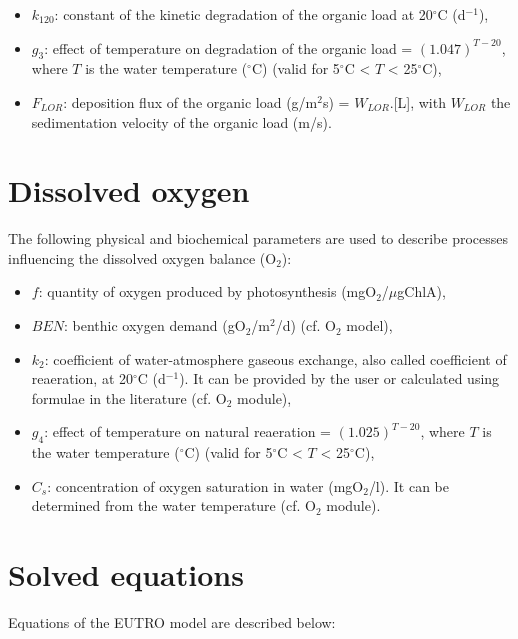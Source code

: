 \begin{itemize}
\item $k_{120}$: constant of the kinetic degradation of the organic load at 20$^{\circ}$C (d$^{-1}$),
\item $g_3$: effect of temperature on degradation of the organic load = $(1.047)^{T-20}$,
  where $T$ is the water temperature ($^{\circ}$C) (valid for 5$^{\circ}$C < $T$ < 25$^{\circ}$C),
\item $F_{LOR}$: deposition flux of the organic load (g/m$^2$s) = $W_{LOR}$.[L],
  with $W_{LOR}$ the sedimentation velocity of the organic load (m/s).
\end{itemize}

\section{Dissolved oxygen}

The following physical and biochemical parameters are used to describe processes
influencing the dissolved oxygen balance (O$_2$):

\begin{itemize}
\item $f$: quantity of oxygen produced by photosynthesis (mgO$_2$/$\mu$gChlA),
\item $BEN$: benthic oxygen demand (gO$_2$/m$^2$/d) (cf. O$_2$ model),
\item $k_2$: coefficient of water-atmosphere gaseous exchange,
  also called coefficient of reaeration, at 20$^{\circ}$C (d$^{-1}$).
  It can be provided by the user or calculated using formulae in the literature (cf. O$_2$ module),
\item $g_4$: effect of temperature on natural reaeration = $(1.025)^{T-20}$,
  where $T$ is the water temperature ($^{\circ}$C) (valid for 5$^{\circ}$C < $T$ < 25$^{\circ}$C),
\item $C_s$: concentration of oxygen saturation in water (mgO$_2$/l).
  It can be determined from the water temperature (cf. O$_2$ module).
\end{itemize}

\section{Solved equations}

Equations of the EUTRO model are described below:\\

